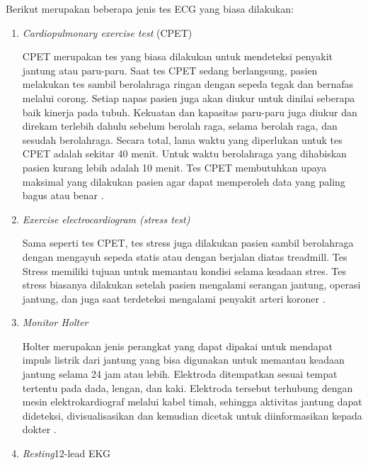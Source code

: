 Berikut merupakan beberapa jenis tes ECG yang biasa dilakukan:
\begin{enumerate}
	\vspace{-2mm}
	\item \textit{Cardiopulmonary exercise test} (CPET)
	\vspace{1ex}
		
	CPET merupakan tes yang biasa dilakukan untuk mendeteksi penyakit jantung atau paru-paru. Saat tes CPET sedang berlangsung, pasien melakukan tes sambil berolahraga ringan dengan sepeda tegak dan bernafas melalui corong. Setiap napas pasien juga akan diukur untuk dinilai seberapa baik kinerja pada tubuh.
	Kekuatan dan kapasitas paru-paru juga diukur dan direkam terlebih dahulu sebelum berolah raga, selama berolah raga, dan sesudah berolahraga.
	Secara total, lama waktu yang diperlukan untuk tes CPET adalah sekitar 40 menit. Untuk waktu berolahraga yang dihabiskan pasien kurang lebih adalah 10 menit. Tes CPET membutuhkan upaya maksimal yang dilakukan pasien agar dapat memperoleh data yang paling bagus atau benar \cite{cit:14}.
	\vspace{-2mm}
	\item \textit{Exercise electrocardiogram (stress test)}
	\vspace{1ex}
	
	Sama seperti tes CPET, tes stress juga dilakukan pasien sambil berolahraga dengan mengayuh sepeda statis atau dengan berjalan diatas treadmill. 
	Tes Stress memiliki tujuan untuk memantau kondisi selama keadaan stres. Tes stress biasanya dilakukan setelah pasien mengalami serangan jantung, operasi jantung, dan juga saat terdeteksi mengalami penyakit arteri koroner \cite{cit:14}.
	\vspace{-2mm}
	\item \textit{Monitor Holter}
	\vspace{1ex}
	
	Holter merupakan jenis perangkat yang dapat dipakai untuk mendapat impuls listrik dari jantung yang bisa digunakan untuk memantau keadaan jantung selama 24 jam atau lebih. Elektroda ditempatkan sesuai tempat tertentu pada dada, lengan, dan kaki.
	Elektroda tersebut terhubung dengan mesin elektrokardiograf melalui kabel timah, sehingga aktivitas jantung dapat dideteksi, divisualisasikan dan kemudian dicetak untuk diinformasikan kepada dokter \cite{cit:14}.
	\vspace{-2mm}
	\item \textit{Resting}12-lead EKG
	\vspace{1ex}
	

\end{enumerate}
